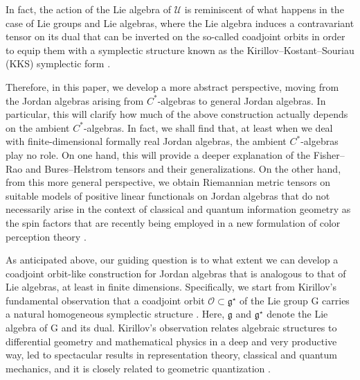 \documentclass[10pt,a4paper]{amsart}
\numberwithin{equation}{section}
\newcommand{\ocal}{\mathcal{O}}
\newcommand{\G}{\mathrm{G}}
\newcommand{\g}{{\mathfrak{g}}}
\begin{document}
In fact, the action of the Lie algebra of $\mathscr{U}$ is reminiscent of what happens in the case of Lie groups and Lie algebras, where the Lie algebra induces a contravariant tensor on its dual that can be inverted on the so-called coadjoint orbits in order to equip them with a symplectic structure known as the Kirillov--Kostant--Souriau (KKS) symplectic form \cite{Kirillov-1962,Kirillov-1976,Kostant-1970,Souriau-1970}.


Therefore, in this paper, we develop a more abstract perspective, moving from the Jordan algebras arising from $C^{*}$-algebras to general Jordan algebras. In particular, this will clarify how much of the above construction actually depends on the ambient $C^{*}$-algebras.
In fact, we shall find that, at least when we deal with finite-dimensional formally real Jordan algebras, the ambient $C^{*}$-algebras play no role.
On one hand, this will provide a deeper explanation of the Fisher--Rao and Bures--Helstrom tensors and their generalizations. On the other hand, from
 this more general perspective, we obtain Riemannian metric tensors on suitable models of positive linear functionals on Jordan algebras that do not necessarily arise in the context of classical and quantum information geometry as the spin factors that are recently being employed in a new formulation of color perception theory \cite{Berthier-2020,B-P-P-2022,B-P-2022,Provenzi-2020,Resnikoff-1974}.

As anticipated above, our guiding question is to what extent we can develop a coadjoint orbit-like construction for Jordan algebras that is analogous to that of Lie algebras, at least in finite dimensions.
Specifically, we start from Kirillov's fundamental observation that a coadjoint orbit $\ocal \subset \g^\star$ of the Lie group $\G$ carries a natural homogeneous symplectic structure \cite{Kirillov-1962,Kirillov-1976}.
Here, $\g$ and $\g^\star$ denote the Lie algebra of $\G$ and its dual.
Kirillov's observation relates algebraic structures to differential geometry and mathematical physics in a deep and very productive way, led to spectacular results in representation theory, classical and quantum mechanics, and it is closely related to geometric quantization \cite{Kirillov-2001}.
\end{document}
